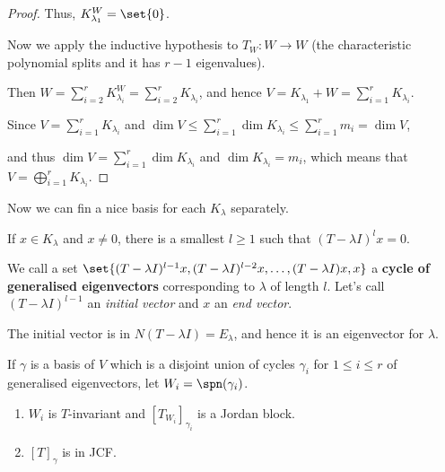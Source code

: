\documentclass[11pt]{scrartcl}
\begin{document}
\begin{proof}
  Thus, $K_{\lambda_1}^W = \set{0}$.

  Now we apply the inductive hypothesis to $T_W: W\to W$ (the
  characteristic polynomial splits and it has $r-1$ eigenvalues).

  Then $W = \sum_{i=2}^rK^W_{\lambda_i} = \sum_{i=2}^rK_{\lambda_i}$, and hence
  $V = K_{\lambda_1}+W  = \sum_{i=1}^rK_{\lambda_i}$.

  Since $V = \sum _{i=1}^rK_{\lambda_i}$ and
  $\dim V \leq \sum_{i=1}^r\dim K_{\lambda_i} \leq \sum_{i=1}^rm_i =
  \dim V$,

  and thus $\dim V = \sum_{i=1}^r \dim K_{\lambda_i}$ and
  $\dim K_{\lambda_i} = m_i$, which means that
  $V = \bigoplus_{i=1}^rK_{\lambda_i}$.
\end{proof}

Now we can fin a nice basis for each $K_{\lambda}$ separately.

If $x \in K_{\lambda}$ and $x\neq 0$, there is a smallest $l \geq 1$
such that $(T-\lambda I)^lx = 0$.

We call a set
$\set{(T-\lambda I)^{l-1}x, (T-\lambda I)^{l-2}x, \dots, (T-\lambda
  I)x, x}$ a \textbf{cycle of generalised eigenvectors} corresponding
to $\lambda$ of length $l$. Let's call $(T-\lambda I)^{l-1}$ an
\textit{initial vector} and $x$ an \textit{end vector}.

The initial vector is in $N(T-\lambda I) = E_{\lambda}$, and hence it
is an eigenvector for $\lambda$.

\begin{theorem}
  \label{sec:exist-uniq-jord}
  If $\gamma$ is a basis of $V$ which is a disjoint union of cycles
  $\gamma_i$ for $1\leq i\leq r$ of generalised eigenvectors, let
  $W_i=\spn(\gamma_i)$.

  \begin{enumerate}[label=\alph*)]
  \item $W_i$ is $T$-invariant and $[T_{W_i}]_{\gamma_i}$ is a Jordan block.
  \item $[T]_\gamma$ is in JCF.
  \end{enumerate}
\end{theorem}
\end{document}
